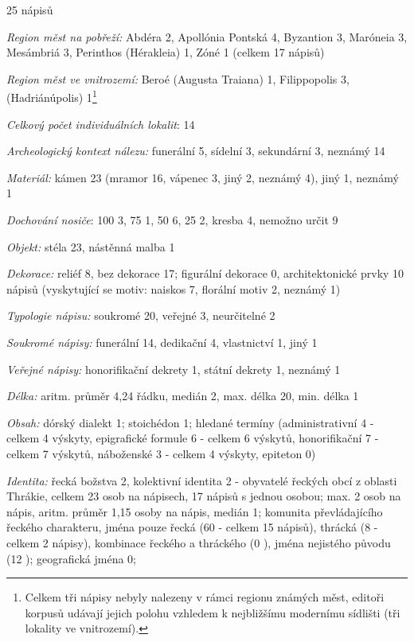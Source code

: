 \placetable[none]{}
\starttable[|l|]
\HL
{} 25 nápisů

{\em Region měst na pobřeží:} Abdéra 2, Apollónia Pontská 4, Byzantion 3, Maróneia 3, Mesámbriá 3, Perinthos (Hérakleia) 1, Zóné 1 (celkem 17 nápisů)

{\em Region měst ve vnitrozemí:} Beroé (Augusta Traiana) 1, Filippopolis 3, (Hadriánúpolis) 1\footnote{Celkem tři nápisy nebyly nalezeny v rámci regionu známých měst, editoři korpusů udávají jejich polohu vzhledem k nejbližšímu modernímu sídlišti (tři lokality ve vnitrozemí).}

{\em Celkový počet individuálních lokalit}: 14

{\em Archeologický kontext nálezu:} funerální 5, sídelní 3, sekundární 3, neznámý 14

{\em Materiál:} kámen 23 (mramor 16, vápenec 3, jiný 2, neznámý 4), jiný 1, neznámý 1

{\em Dochování nosiče}: 100  3, 75  1, 50  6, 25  2, kresba 4, nemožno určit 9

{\em Objekt:} stéla 23, nástěnná malba 1

{\em Dekorace:} reliéf 8, bez dekorace 17; figurální dekorace 0, architektonické prvky 10 nápisů (vyskytující se motiv: naiskos 7, florální motiv 2, neznámý 1)

{\em Typologie nápisu:} soukromé 20, veřejné 3, neurčitelné 2

{\em Soukromé nápisy:} funerální 14, dedikační 4, vlastnictví 1, jiný 1

{\em Veřejné nápisy:} honorifikační dekrety 1, státní dekrety 1, neznámý 1

{\em Délka:} aritm. průměr 4,24 řádku, medián 2, max. délka 20, min. délka 1

{\em Obsah:} dórský dialekt 1; stoichédon 1; hledané termíny (administrativní 4 - celkem 4 výskyty, epigrafické formule 6 - celkem 6 výskytů, honorifikační 7 - celkem 7 výskytů, náboženské 3 - celkem 4 výskyty, epiteton 0)

{\em Identita:} řecká božstva 2, kolektivní identita 2 - obyvatelé řeckých obcí z oblasti Thrákie, celkem 23 osob na nápisech, 17 nápisů s jednou osobou; max. 2 osob na nápis, aritm. průměr 1,15 osoby na nápis, medián 1; komunita převládajícího řeckého charakteru, jména pouze řecká (60  - celkem 15 nápisů), thrácká (8  - celkem 2 nápisy), kombinace řeckého a thráckého (0 ), jména nejistého původu (12 ); geografická jména 0;

